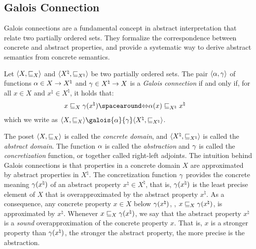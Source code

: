 \subsection{Galois Connection}

Galois connections are a fundamental concept in abstract interpretation that relate two partially ordered sets.
They formalize the correspondence between concrete and abstract properties, and provide a systematic way to derive abstract semantics from concrete semantics.

\begin{definition}
  Let $\langle X, \sqsubseteq_X \rangle$ and $\langle {X^\natural}, \sqsubseteq_{X^\natural} \rangle$ be two partially ordered sets.
  The pair $\langle \alpha, \gamma \rangle$ of functions $\alpha\in X \to {X^\natural}$ and $\gamma\in {X^\natural} \to X$ is a \emph{Galois connection} if and only if, for all $x\in X$ and ${x^\natural}\in {X^\natural}$, it holds that:
  \begin{align*}
    x \sqsubseteq_X \concretization({x^\natural}) &\IfF \abstraction(x) \sqsubseteq_{X^\natural} {x^\natural}
  \end{align*}
  which we write as $\tuple{X}{\sqsubseteq_X}\galois{\abstraction}{\concretization}\tuple{{X^\natural}}{\sqsubseteq_{X^\natural}}$.
\end{definition}

The poset $\langle X, \sqsubseteq_X \rangle$ is called the \emph{concrete domain}, and $\langle {X^\natural}, \sqsubseteq_{X^\natural} \rangle$ is called the \emph{abstract domain}. The function $\alpha$ is called the \emph{abstraction} and $\gamma$ is called the \emph{concretization} function, or together called right-left adjoints.
The intuition behind Galois connections is that properties in a concrete domain $X$ are approximated by abstract properties in ${X^\natural}$.
The concretization function $\gamma$ provides the concrete meaning $\gamma({x^\natural})$ of an abstract property ${x^\natural}\in {X^\natural}$, that is, $\gamma({x^\natural})$ is the least precise element of $X$ that is overapproximated by the abstract property ${x^\natural}$. As a consequence, any concrete property $x\in X$ below $\gamma({x^\natural})$, \ie, $x \sqsubseteq_X \gamma({x^\natural})$, is approximated by ${x^\natural}$.
Whenever $x \sqsubseteq_X \gamma({x^\natural})$, we say that the abstract property ${x^\natural}$ is a \emph{sound} overapproximation of the concrete property $x$. That is, $x$ is a stronger property than $\gamma({x^\natural})$, the stronger the abstract property, the more precise is the abstraction.

